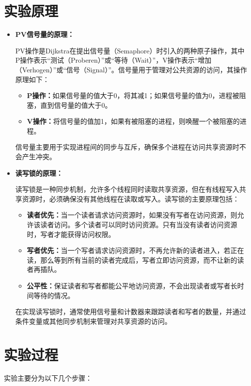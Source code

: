 \documentclass{LabReport}
\begin{document}
	\section{实验原理}
	\begin{itemize}
	\item \textbf{PV信号量的原理：}
	
	PV操作是Dijkstra在提出信号量（Semaphore）时引入的两种原子操作，其中P操作表示“测试（Proberen）”或“等待（Wait）”，V操作表示“增加（Verhogen）”或“信号（Signal）”。信号量用于管理对公共资源的访问，其操作原理如下：
	
	\begin{itemize}
		\item \textbf{P操作：}如果信号量的值大于0，将其减1；如果信号量的值为0，进程被阻塞，直到信号量的值大于0。
		\item \textbf{V操作：}将信号量的值加1，如果有被阻塞的进程，则唤醒一个被阻塞的进程。
	\end{itemize}
	
	信号量主要用于实现进程间的同步与互斥，确保多个进程在访问共享资源时不会产生冲突。
	
	\item \textbf{读写锁的原理：}
	
	读写锁是一种同步机制，允许多个线程同时读取共享资源，但在有线程写入共享资源时，必须确保没有其他线程在读取或写入。读写锁的主要原理包括：
	
	\begin{itemize}
		\item \textbf{读者优先：}当一个读者请求访问资源时，如果没有写者在访问资源，则允许该读者访问。多个读者可以同时访问资源。只有当没有读者访问资源时，写者才能获得访问权限。
		\item \textbf{写者优先：}当一个写者请求访问资源时，不再允许新的读者进入，若正在读，那么等到所有当前的读者完成后，写者立即访问资源，而不让新的读者再插队。
		\item \textbf{公平性：}保证读者和写者都能公平地访问资源，不会出现读者或写者长时间等待的情况。
	\end{itemize}
	
	在实现读写锁时，通常使用信号量和计数器来跟踪读者和写者的数量，并通过条件变量或其他同步机制来管理对共享资源的访问。
	
	\end{itemize}
	
	\section{实验过程}
	\par\hspace{0em}实验主要分为以下几个步骤：
	
\end{document}

